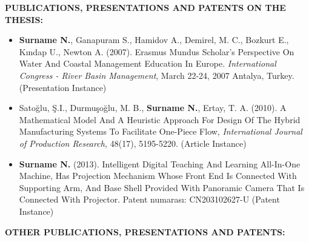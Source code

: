\textbf{PUBLICATIONS, PRESENTATIONS AND PATENTS ON THE THESIS:} 
\vspace{-3mm}
\begin{itemize}
   \item {\bf Surname N.}, Ganapuram S., Hamidov A., Demirel, M. C., Bozkurt E., Kındap U., Newton A.
   (2007). Erasmus Mundus Scholar's Perspective On Water And Coastal
   Management Education In Europe. 
   \textit{International Congress - River Basin Management}, 
   March 22-24, 2007 Antalya, Turkey. (Presentation Instance)

   \item Satoğlu, Ş.I., Durmuşoğlu, M. B., {\bf Surname N.}, Ertay, T. A. (2010). A Mathematical Model 
   And A Heuristic Approach For Design Of The Hybrid Manufacturing Systems 
   To Facilitate One-Piece Flow, 
   \textit{International Journal of Production Research,}
   48(17), 5195-5220. (Article Instance)


   \item  {\bf Surname N.} (2013). Intelligent Digital Teaching And Learning All-In-One Machine,
   Has Projection Mechanism Whose Front End Is Connected With Supporting
   Arm, And Base Shell Provided With Panoramic Camera That Is Connected With
   Projector. Patent numarası: CN203102627-U (Patent Instance)
\end{itemize}

\newpage

\textbf{OTHER PUBLICATIONS, PRESENTATIONS AND PATENTS:} 
\vspace{-3mm}
